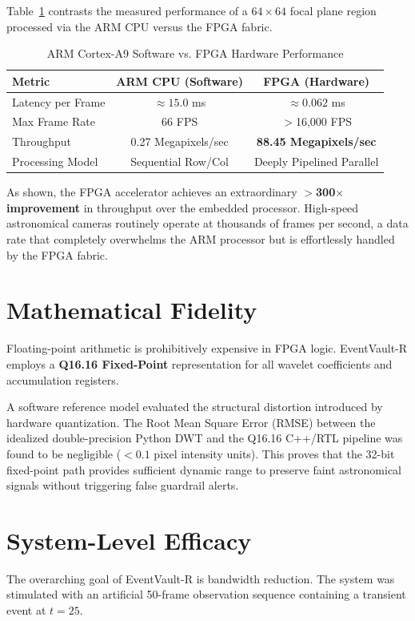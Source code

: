 \documentclass[journal]{IEEEtran}
\begin{document}
Table~\ref{tab:comparison} contrasts the measured performance of a $64 \times 64$ focal plane region processed via the ARM CPU versus the FPGA fabric.

\begin{table}[ht]
\centering
\caption{ARM Cortex-A9 Software vs. FPGA Hardware Performance}
\label{tab:comparison}
\begin{tabular}{@{}lcc@{}}
\toprule
\textbf{Metric} & \textbf{ARM CPU (Software)} & \textbf{FPGA (Hardware)} \\ \midrule
Latency per Frame & $\approx 15.0$ ms & $\approx 0.062$ ms \\
Max Frame Rate & 66 FPS & $>$16,000 FPS \\
Throughput & 0.27 Megapixels/sec & \textbf{88.45 Megapixels/sec} \\ 
Processing Model & Sequential Row/Col & Deeply Pipelined Parallel \\ \bottomrule
\end{tabular}
\end{table}

As shown, the FPGA accelerator achieves an extraordinary \textbf{$>$300$\times$ improvement} in throughput over the embedded processor. High-speed astronomical cameras routinely operate at thousands of frames per second, a data rate that completely overwhelms the ARM processor but is effortlessly handled by the FPGA fabric.

\section{Mathematical Fidelity}
Floating-point arithmetic is prohibitively expensive in FPGA logic. EventVault-R employs a \textbf{Q16.16 Fixed-Point} representation for all wavelet coefficients and accumulation registers.

A software reference model evaluated the structural distortion introduced by hardware quantization. The Root Mean Square Error (RMSE) between the idealized double-precision Python DWT and the Q16.16 C++/RTL pipeline was found to be negligible ($<0.1$ pixel intensity units). This proves that the 32-bit fixed-point path provides sufficient dynamic range to preserve faint astronomical signals without triggering false guardrail alerts.

\section{System-Level Efficacy}
The overarching goal of EventVault-R is bandwidth reduction. The system was stimulated with an artificial 50-frame observation sequence containing a transient event at $t=25$.
\end{document}
